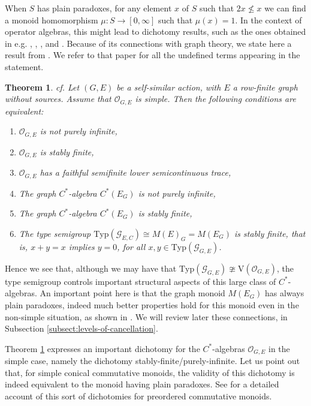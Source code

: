 \documentclass[11pt]{amsart}
\theoremstyle{plain}            %
\newtheorem{theorem}{Theorem}[section]
\theoremstyle{definition}       %
\theoremstyle{definition}       %
\theoremstyle{remark}
\newcommand{\V}{\mathrm{V}}
\newcommand{\Typ}{\mathrm{Typ}}
\begin{document}
When $S$ has plain paradoxes, for any element $x$ of $S$ such that $2x\nleq x$ we can find a monoid homomorphism $\mu \colon S\to [0,\infty]$ such that $\mu (x)=1$. In the context of operator algebras, this 
might lead to dichotomy results, such as the ones obtained in e.g. \cite{ACAHMTolich}, \cite{bl20}, \cite{KMP25}, \cite{ma} and \cite{RS}. 
Because of its connections with graph theory, we state here a result from \cite{KMP25}. We refer to that paper for all the undefined terms appearing in the statement.    

\begin{theorem} {\rm{cf. \cite[Theorem 7.15]{KMP25}}}
	\label{thm:DichotomyEP}
	Let $(G,E)$ be a self-similar action, with $E$ a row-finite graph without sources. 
	Assume that $\mathcal O _{G,E}$ is simple. Then the following conditions are equivalent:
	\begin{enumerate}
		\item $\mathcal O _{G,E}$ is not purely infinite,
		\item $\mathcal O _{G,E}$ is stably finite,
		\item $\mathcal O _{G,E}$ has a faithful semifinite lower semicontinuous trace,
		\item The graph $C^*$-algebra $C^*(E_G)$ is not purely infinite,
		\item The graph $C^*$-algebra $C^*(E_G)$ is stably finite,
		\item The type semigroup $\Typ (\mathcal G_{E,C})\cong M(E)_G = M(E_G)$ is stably finite, that is, $x+y=x$ implies $y=0$, for all $x,y\in \Typ (\mathcal G _{G,E})$.   
	\end{enumerate}
\end{theorem}

Hence we see that, although we may have that $\Typ (\mathcal G_{G,E})\ncong \V (\mathcal O _{G,E})$, the type semigroup controls important structural aspects of this large class of $C^*$-algebras. An important point here is that the graph monoid $M(E_G)$ has always plain paradoxes, indeed much better properties hold for this monoid even in the non-simple situation, as shown in \cite[Theorem 6.3, Proposition 6.4]{amp07}. We will review later these connections, in Subsection \ref{subsect:levels-of-cancellation}.   

Theorem \ref{thm:DichotomyEP} expresses an important dichotomy for the $C^*$-algebras $\mathcal O _{G,E}$ in the simple case, namely the dichotomy stably-finite/purely-infinite. Let us point out that, for simple conical commutative monoids, the validity of this dichotomy is indeed equivalent to the monoid having plain paradoxes. See \cite[Section 2]{KMP25} for a detailed account of this sort of dichotomies for preordered commutative monoids.
\end{document}

